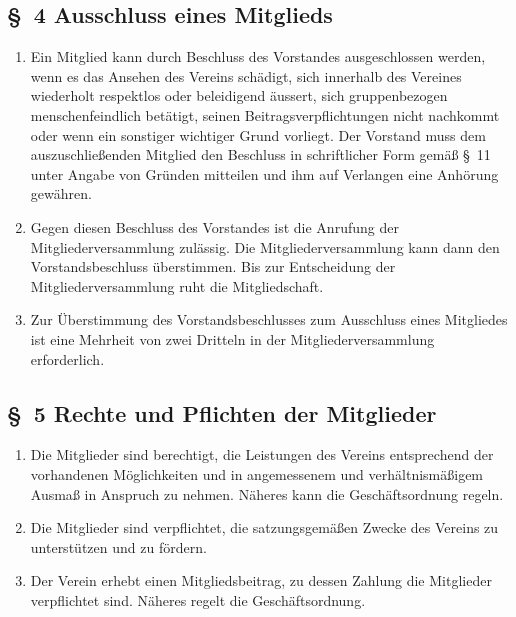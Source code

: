 \documentclass[10pt,a4paper]{scrartcl}
\begin{document}
\subsection*{\S \ 4 Ausschluss eines Mitglieds }
\begin{enumerate}
	\item Ein Mitglied kann durch Beschluss des Vorstandes ausgeschlossen werden, wenn es das
                Ansehen des Vereins sch{\"a}digt, sich innerhalb des Vereines wiederholt respektlos oder 
                beleidigend {\"a}ussert, sich gruppenbezogen menschenfeindlich bet{\"a}tigt, seinen Beitragsverpflichtungen nicht nachkommt oder 
		wenn ein sonstiger wichtiger Grund vorliegt. Der Vorstand muss dem auszuschlie{\ss}enden
		Mitglied den Beschluss in schriftlicher Form gem{\"a}{\ss} \S \ 11 unter Angabe von Gr{\"u}nden
		mitteilen und ihm auf Verlangen eine Anh{\"o}rung gew{\"a}hren.
        \item Gegen diesen Beschluss des Vorstandes ist die Anrufung der Mitgliederversammlung zu\-l{\"a}s\-sig. Die Mitgliederversammlung kann dann den Vorstandsbeschluss {\"u}berstimmen.
				Bis zur Entscheidung der Mitgliederversammlung ruht die Mitgliedschaft.
		\item Zur {\"U}berstimmung des Vorstandsbeschlusses zum Ausschluss eines Mitgliedes ist eine Mehrheit von zwei Dritteln in der Mitgliederversammlung erforderlich.
	
\end{enumerate}
%
%
\subsection*{\S \ 5 Rechte und Pflichten der Mitglieder}
\begin{enumerate}
	\item Die Mitglieder sind berechtigt, die Leistungen des Vereins entsprechend der vorhandenen
		M{\"o}glichkeiten und in angemessenem und verh{\"a}ltnism{\"a}{\ss}igem Ausma{\ss} in Anspruch zu nehmen.
                N{\"a}\-he\-res kann die Gesch{\"a}ftsordnung regeln.
	\item Die Mitglieder sind verpflichtet, die satzungsgem{\"a}{\ss}en Zwecke des Vereins zu unterst{\"u}tzen
		und zu f{\"o}rdern.
	\item Der Verein erhebt einen Mitgliedsbeitrag, zu dessen Zahlung die Mitglieder verpflichtet
		sind. N{\"a}heres regelt die Gesch{\"a}ftsordnung.
        
\end{enumerate}
%
%
\end{document}
